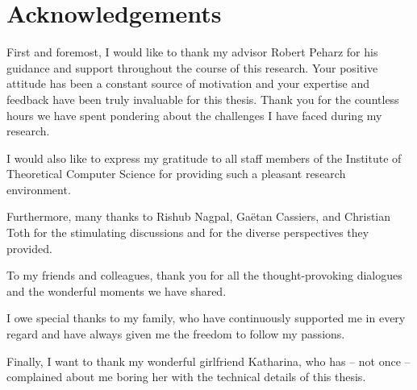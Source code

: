\chapter{Acknowledgements}

First and foremost, I would like to thank my advisor Robert Peharz for his guidance and support throughout the course of this research. Your positive attitude has been a constant source of motivation and your expertise and feedback have been truly invaluable for this thesis. Thank you for the countless hours we have spent pondering about the challenges I have faced during my research.

I would also like to express my gratitude to all staff members of the Institute of Theoretical Computer Science for providing such a pleasant research environment.

Furthermore, many thanks to Rishub Nagpal, Ga{\"{e}}tan Cassiers, and Christian Toth for the stimulating discussions and for the diverse perspectives they provided.


To my friends and colleagues, thank you for all the thought-provoking dialogues and the wonderful moments we have shared.

I owe special thanks to my family, who have continuously supported me in every regard and have always given me the freedom to follow my passions. 

Finally, I want to thank my wonderful girlfriend Katharina, who has -- not once -- complained about me boring her with the technical details of this thesis.
